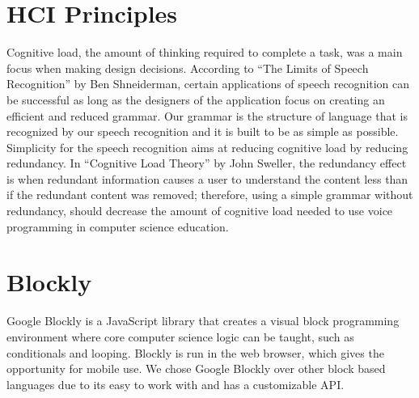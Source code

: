 \documentclass[]{article}
\begin{document}
\section{HCI Principles}
Cognitive load, the amount of thinking required to complete a task, was a main focus when
making design decisions. According to ``The Limits of Speech Recognition'' by Ben Shneiderman, certain
applications of speech recognition can be successful as long as the designers of the application 
focus on creating an efficient and reduced grammar. Our grammar is the structure of language that is 
recognized by our speech recognition and it is built to be as simple as possible. Simplicity for the
speech recognition aims at reducing cognitive load by reducing redundancy. In “Cognitive Load Theory”
by John Sweller, the redundancy effect is when redundant information causes a user to understand the content
less than if the redundant content was removed; therefore, using a simple grammar without redundancy,
should decrease the amount of cognitive load needed to use voice programming in computer science education.

\section{Blockly}
Google Blockly is a JavaScript library that creates a visual block programming 
environment where core computer science logic can be taught, such as conditionals and 
looping. Blockly is run in the web browser, which gives the opportunity for mobile use. 
We chose Google Blockly over other block based languages due to its easy to work with and 
has a customizable API.
\end{document}
